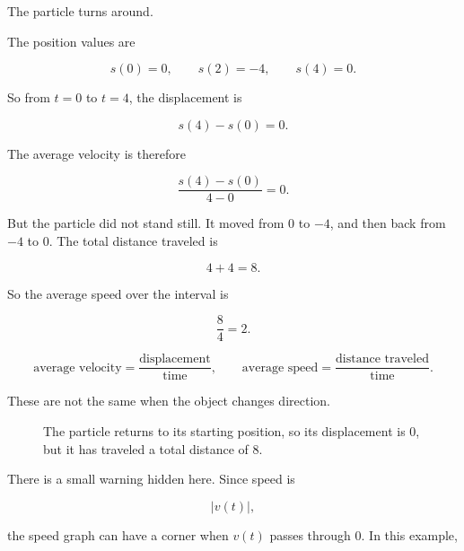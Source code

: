 The particle turns around.

The position values are

\[
s(0)=0,
\qquad
s(2)=-4,
\qquad
s(4)=0.
\]

So from \(t=0\) to \(t=4\), the displacement is

\[
s(4)-s(0)=0.
\]

The average velocity is therefore

\[
\frac{s(4)-s(0)}{4-0}=0.
\]

But the particle did not stand still.  It moved from \(0\) to \(-4\), and then back from \(-4\) to \(0\).  The total distance traveled is

\[
4+4=8.
\]

So the average speed over the interval is

\[
\frac{8}{4}=2.
\]

\[
\boxed{
\text{average velocity}
=
\frac{\text{displacement}}{\text{time}},
\qquad
\text{average speed}
=
\frac{\text{distance traveled}}{\text{time}}.
}
\]

These are not the same when the object changes direction.

\begin{figure}[h]
\centering
{}
\caption{The particle returns to its starting position, so its displacement is \(0\), but it has traveled a total distance of \(8\).}
\label{fig:speed-vs-velocity-return}
\end{figure}

There is a small warning hidden here.  Since speed is

\[
|v(t)|,
\]

the speed graph can have a corner when \(v(t)\) passes through \(0\).  In this example,

